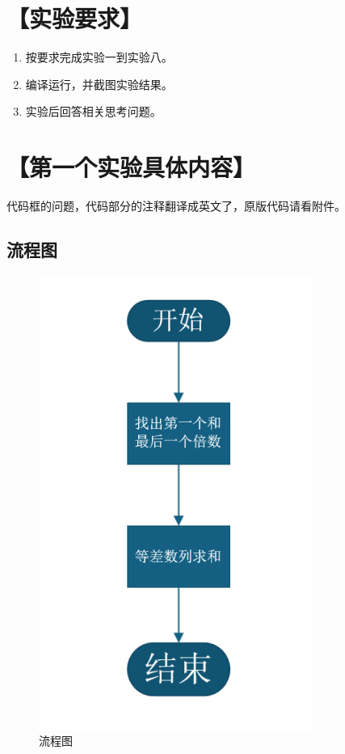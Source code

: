 \documentclass[12pt,a4paper]{article}
\begin{document}
\section*{【实验要求】}
\begin{enumerate}
    \item 按要求完成实验一到实验八。
    \item 编译运行，并截图实验结果。
    \item 实验后回答相关思考问题。
\end{enumerate}

\section*{【第一个实验具体内容】}
代码框的问题，代码部分的注释翻译成英文了，原版代码请看附件。
\subsection*{流程图}

\begin{figure}[H]
\centering
\includegraphics[width=0.8\textwidth]{one1.png}
\caption{流程图}
\end{figure}
\end{document}
